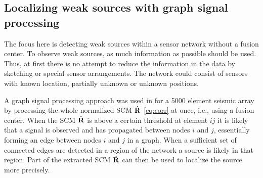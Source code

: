 \subsection{Localizing weak sources with graph signal processing}
 \label{sec:weakSources}


The focus here is detecting weak sources within a sensor network without a fusion center. To observe weak sources, as much information as possible should be used. Thus, at first there is no attempt to reduce the information in the data by sketching or special sensor arrangements. The network could consist of sensors with known location, partially unknown or unknown positions.



A graph signal processing approach was used in \cite{riahi2017} for a 5000 element seismic array by processing the whole normalized SCM $\hat{\bf R}$ \eqref{eq:corr} at once, i.e., using a fusion center. 
When the SCM $\hat{\bf R }$ is above a certain threshold at  element $ij$ it is likely that a signal is observed and has propagated between nodes $i$ and $j$, essentially forming an edge between nodes  $i$ and $j$ in a graph. When a sufficient set of connected edges are detected in a region of the network a source is likely in that region. Part of the extracted SCM $\hat{\bf R}$ can then be used to localize the source more precisely.

